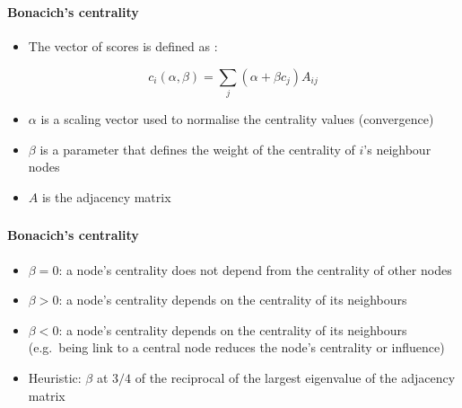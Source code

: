 \documentclass[8pt]{beamer}
\begin{document}
\begin{frame}
\frametitle{\insertsection}
\framesubtitle{Bonacich's centrality}

\begin{itemize}
	\item The vector of {\color{blue}{Bonacich's centrality (power centrality)}} scores is defined as \cite{Bonacich1987}:
\end{itemize}

\centering
\begin{equation*}
c_i(\alpha,\beta) = \sum_{j}(\alpha+\beta c_j)A_{ij}
\end{equation*}

\begin{itemize}
	\item $\alpha$ is a scaling vector used to normalise the centrality values (convergence)
	\item $\beta$ is a parameter that defines the weight of the centrality of $i$'s neighbour nodes
	\item $A$ is the adjacency matrix
\end{itemize}

\end{frame}

\begin{frame}
\frametitle{\insertsection}
\framesubtitle{Bonacich's centrality}

\begin{itemize}
	\item $\beta = 0$: a node's centrality does not depend from the centrality of other nodes
	\item $\beta > 0$: a node's centrality {\color{blue}{positively}} depends on the centrality of its neighbours
	\item $\beta < 0$: a node's centrality {\color{blue}{negatively}} depends on the centrality of its neighbours (e.g.\  being link to a central node reduces the node's centrality or influence)
	\item Heuristic: $\beta$ at $3/4$ of the reciprocal of the largest eigenvalue of the adjacency matrix  
\end{itemize}

\end{frame}
\end{document}

